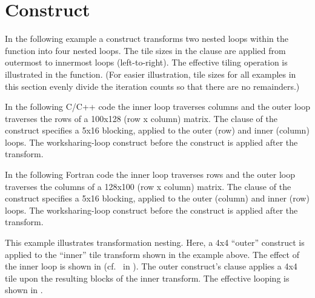 \section{ Construct}
\label{sec:tile}

In the following example a  construct transforms two nested loops
within the  function into four nested loops.
The tile sizes in the  clause are applied from outermost
to innermost loops (left-to-right). The effective tiling operation is illustrated in
the  function. 
(For easier illustration, tile sizes for all examples in this section evenly 
divide the iteration counts so that there are no remainders.)

In the following C/C++ code the inner loop traverses columns
and the outer loop traverses the rows of a 100x128 (row x column) matrix.  
The  clause of the  construct specifies
a 5x16 blocking, applied to the outer (row) and inner (column) loops.
The worksharing-loop construct before the 
construct is applied after the transform.


In the following Fortran code the inner loop traverses rows 
and the outer loop traverses the columns of a 128x100 (row x column) matrix.  
The   clause of the  construct specifies 
a 5x16 blocking, applied to the outer (column) and inner (row) loops.
The worksharing-loop construct before the 
construct is applied after the transform.

\clearpage

This example illustrates transformation nesting.
Here, a 4x4 ``outer''   construct is applied to the ``inner'' tile transform shown in the example above.
The effect of the inner loop is shown in  (cf.\  in ).
The outer  construct's  clause applies a 4x4 tile upon the resulting
blocks of the inner transform. The effective looping is shown in .

\clearpage

